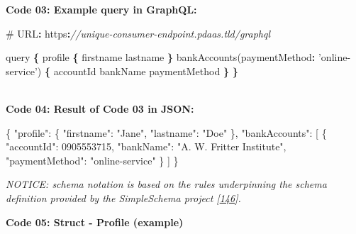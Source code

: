 \documentclass[12pt,english,a4paper,titlepage,cleardoublepage=empty,dottedtoc]{report}
\newenvironment{Shaded}{\begin{snugshade}}{\end{snugshade}}
\newcommand{\DataTypeTok}[1]{\textcolor[rgb]{0.13,0.29,0.53}{{#1}}}
\newcommand{\DecValTok}[1]{\textcolor[rgb]{0.00,0.00,0.81}{{#1}}}
\newcommand{\StringTok}[1]{\textcolor[rgb]{0.31,0.60,0.02}{{#1}}}
\newcommand{\CommentTok}[1]{\textcolor[rgb]{0.56,0.35,0.01}{\textit{{#1}}}}
\newcommand{\OtherTok}[1]{\textcolor[rgb]{0.56,0.35,0.01}{{#1}}}
\newcommand{\FunctionTok}[1]{\textcolor[rgb]{0.00,0.00,0.00}{{#1}}}
\newcommand{\OperatorTok}[1]{\textcolor[rgb]{0.81,0.36,0.00}{\textbf{{#1}}}}
\newcommand{\AttributeTok}[1]{\textcolor[rgb]{0.77,0.63,0.00}{{#1}}}
\newcommand{\NormalTok}[1]{{#1}}
\begin{document}
\newpage

\textbf{\protect\hypertarget{code-03_graphql-query}{}{Code 03: Example
query in GraphQL}:}

\begin{Shaded}
\begin{Highlighting}[numbers=left,,]
\NormalTok{# URL}\OperatorTok{:} \NormalTok{https}\OperatorTok{:}\CommentTok{//unique-consumer-endpoint.pdaas.tld/graphql}

\NormalTok{query }\OperatorTok{\{}
    \NormalTok{profile }\OperatorTok{\{}
        \NormalTok{firstname}
        \NormalTok{lastname}
    \OperatorTok{\}}
    \AttributeTok{bankAccounts}\NormalTok{(}\DataTypeTok{paymentMethod}\OperatorTok{:} \StringTok{'online-service'}\NormalTok{) }\OperatorTok{\{}
        \NormalTok{accountId}
        \NormalTok{bankName}
        \NormalTok{paymentMethod}
    \OperatorTok{\}}
\OperatorTok{\}}
\end{Highlighting}
\end{Shaded}

~\\
\textbf{\protect\hypertarget{code-04_graphql-query-result}{}{Code 04:
Result of Code 03 in JSON}:}

\begin{Shaded}
\begin{Highlighting}[numbers=left,,]
\FunctionTok{\{}
    \DataTypeTok{"profile"}\FunctionTok{:} \FunctionTok{\{}
        \DataTypeTok{"firstname"}\FunctionTok{:} \StringTok{"Jane"}\FunctionTok{,} 
        \DataTypeTok{"lastname"}\FunctionTok{:} \StringTok{"Doe"}
    \FunctionTok{\},}
    \DataTypeTok{"bankAccounts"}\FunctionTok{:} \OtherTok{[}
        \FunctionTok{\{}
            \DataTypeTok{"accountId"}\FunctionTok{:} \DecValTok{0905553715}\FunctionTok{,}
            \DataTypeTok{"bankName"}\FunctionTok{:} \StringTok{"A. W. Fritter Institute"}\FunctionTok{,}
            \DataTypeTok{"paymentMethod"}\FunctionTok{:} \StringTok{"online-service"}
        \FunctionTok{\}}
    \OtherTok{]}
\FunctionTok{\}}
\end{Highlighting}
\end{Shaded}

\newpage

\emph{NOTICE: schema notation is based on the rules underpinning the
schema definition provided by the SimpleSchema project
{[}\protect\hyperlink{ref-web_2017_repo_node-simple-schema}{146}{]}.}

\textbf{\protect\hypertarget{code-05_struct_profile}{}{Code 05: Struct -
Profile (example)}}
\end{document}
